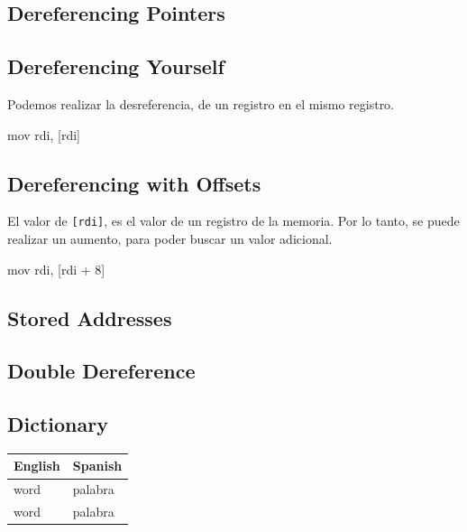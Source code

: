 \subsection{Dereferencing Pointers}\label{subsec:dereferencing_pointers}

\subsection{Dereferencing Yourself}\label{subsec:dereferencing_yourself}

Podemos realizar la desreferencia, de un registro en el mismo registro.

\begin{codebox}[ASM]{}
	mov rdi, [rdi]
\end{codebox}

\subsection{Dereferencing with Offsets}\label{subsec:dereferencing_with_offsets}

El valor de \texttt{[rdi]}, es el valor de un registro de la memoria. Por lo tanto,
se puede realizar un aumento, para poder buscar un valor adicional.

\begin{codebox}[ASM]{}
	mov rdi, [rdi + 8]
\end{codebox}

\subsection{Stored Addresses}\label{subsec:stored_addresses}

\subsection{Double Dereference}\label{subsec:double_dereference}

\subsection{Dictionary}\label{subsec:dictionary}

\begin{center}
	\begin{tabular}{|l|l|}
		\hline
		\textbf{English} & \textbf{Spanish} \\ \hline
		word             & palabra          \\ \hline
		word             & palabra          \\ \hline
	\end{tabular}
\end{center}
